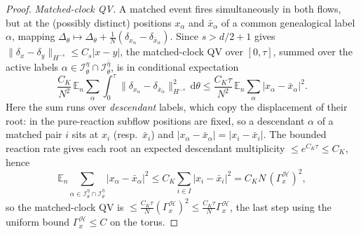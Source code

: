 \documentclass[a4paper,fleqn]{cas-sc}
\theoremstyle{definition}
\theoremstyle{remark}
\begin{document}
\begin{proof}
\emph{Matched-clock QV.} A matched event fires simultaneously in both flows, but
at the (possibly distinct) positions $x_\alpha$ and $\bar x_\alpha$ of a common
genealogical label $\alpha$, mapping
$\Delta_\theta\mapsto\Delta_\theta+\frac1N(\delta_{x_\alpha}-\delta_{\bar x_\alpha})$.
Since $s>d/2+1$ gives $\|\delta_x-\delta_y\|_{H^{-s}}\le C_s|x-y|$, the
matched-clock QV over $[0,\tau]$, summed over the active labels
$\alpha\in\mathcal I^\eta_\theta\cap\mathcal I^{\bar\eta}_\theta$, is in conditional
expectation
\[
\frac{C_K}{N^2}\,\mathbb E_n\!\sum_{\alpha}\int_0^\tau\|\delta_{x_\alpha}-\delta_{\bar x_\alpha}\|_{H^{-s}}^2\,\mathrm d\theta
\le\frac{C_K\tau}{N^2}\,\mathbb E_n\!\sum_{\alpha}|x_\alpha-\bar x_\alpha|^2 .
\]
Here the sum runs over \emph{descendant} labels, which copy the displacement of
their root: in the pure-reaction subflow positions are fixed, so a descendant
$\alpha$ of a matched pair $i$ sits at $x_i$ (resp.\ $\bar x_i$) and
$|x_\alpha-\bar x_\alpha|=|x_i-\bar x_i|$. The bounded reaction rate gives each root
an expected descendant multiplicity $\le e^{C_K\tau}\le C_K$, hence
\[
\mathbb E_n\!\!\sum_{\alpha\in\mathcal I^\eta_\theta\cap\mathcal I^{\bar\eta}_\theta}\!\!|x_\alpha-\bar x_\alpha|^2
\le C_K\sum_{i\in I}|x_i-\bar x_i|^2=C_KN\,(\Gamma_x^{\mathcal H})^2,
\]
so the matched-clock QV is
$\le\frac{C_K\tau}{N}(\Gamma_x^{\mathcal H})^2\le\frac{C_K\tau}{N}\Gamma_x^{\mathcal H}$,
the last step using the uniform bound $\Gamma_x^{\mathcal H}\le C$ on the torus.


\end{proof}
\end{document}

